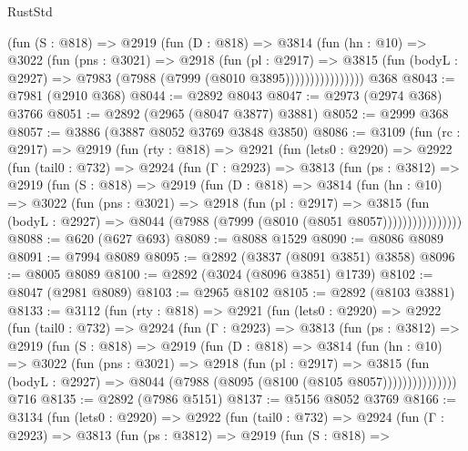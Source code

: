 \begin{lexlean}{RustStd}
\begin{coremodule}
                  (fun (S : @818) =>
                  @2919
                    (fun (D : @818) =>
                    @3814
                      (fun (hn : @10) =>
                      @3022
                        (fun (pns : @3021) =>
                        @2918
                          (fun (pl : @2917) =>
                          @3815
                            (fun (bodyL : @2927) => @7983 (@7988 (@7999 (@8010 @3895))))))))))))))))
    @368
@8043 := @7981 (@2910 @368)
@8044 := @2892 @8043
@8047 := @2973 (@2974 @368) @3766
@8051 := @2892 (@2965 (@8047 @3877) @3881)
@8052 := @2999 @368
@8057 := @3886 (@3887 @8052 @3769 @3848 @3850)
@8086 := @3109
    (fun (rc : @2917) =>
    @2919
      (fun (rty : @818) =>
      @2921
        (fun (lets0 : @2920) =>
        @2922
          (fun (tail0 : @732) =>
          @2924
            (fun (Γ : @2923) =>
            @3813
              (fun (ps : @3812) =>
              @2919
                (fun (S : @818) =>
                @2919
                  (fun (D : @818) =>
                  @3814
                    (fun (hn : @10) =>
                    @3022
                      (fun (pns : @3021) =>
                      @2918
                        (fun (pl : @2917) =>
                        @3815
                          (fun (bodyL : @2927) =>
                          @8044 (@7988 (@7999 (@8010 (@8051 @8057))))))))))))))))
@8088 := @620 (@627 @693)
@8089 := @8088 @1529
@8090 := @8086 @8089
@8091 := @7994 @8089
@8095 := @2892 (@3837 (@8091 @3851) @3858)
@8096 := @8005 @8089
@8100 := @2892 (@3024 (@8096 @3851) @1739)
@8102 := @8047 (@2981 @8089)
@8103 := @2965 @8102
@8105 := @2892 (@8103 @3881)
@8133 := @3112
    (fun (rty : @818) =>
    @2921
      (fun (lets0 : @2920) =>
      @2922
        (fun (tail0 : @732) =>
        @2924
          (fun (Γ : @2923) =>
          @3813
            (fun (ps : @3812) =>
            @2919
              (fun (S : @818) =>
              @2919
                (fun (D : @818) =>
                @3814
                  (fun (hn : @10) =>
                  @3022
                    (fun (pns : @3021) =>
                    @2918
                      (fun (pl : @2917) =>
                      @3815
                        (fun (bodyL : @2927) =>
                        @8044 (@7988 (@8095 (@8100 (@8105 @8057)))))))))))))))
    @716
@8135 := @2892 (@7986 @5151)
@8137 := @5156 @8052 @3769
@8166 := @3134
    (fun (lets0 : @2920) =>
    @2922
      (fun (tail0 : @732) =>
      @2924
        (fun (Γ : @2923) =>
        @3813
          (fun (ps : @3812) =>
          @2919
            (fun (S : @818) =>

\end{coremodule}
\end{lexlean}
